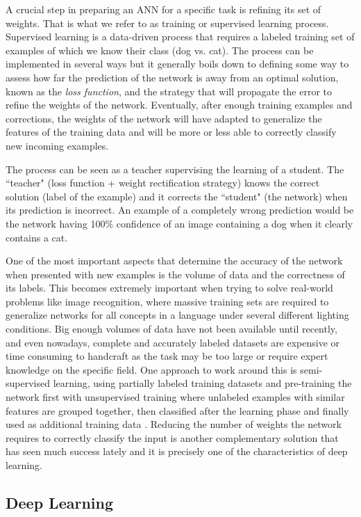 A crucial step in preparing an ANN for a specific task is refining its set of weights.
That is what we refer to as training or supervised learning process.
Supervised learning is a data-driven process that requires a labeled training set of examples of which we know their class (dog vs. cat).
The process can be implemented in several ways but it generally boils down to defining some way to assess how far the prediction of the network is away from an optimal solution, known as the \emph{loss function}, and the strategy that will propagate the error to refine the weights of the network.
Eventually, after enough training examples and corrections, the weights of the network will have adapted to generalize the features of the training data and will be more or less able to correctly classify new incoming examples.

The process can be seen as a teacher supervising the learning of a student.
The ``teacher" (loss function + weight rectification strategy) knows the correct solution (label of the example) and it corrects the ``student" (the network) when its prediction is incorrect.
An example of a completely wrong prediction would be the network having 100\% confidence of an image containing a dog when it clearly contains a cat.

One of the most important aspects that determine the accuracy of the network when presented with new examples is the volume of data and the correctness of its labels.
This becomes extremely important when trying to solve real-world problems like image recognition, where massive training sets are required to generalize networks for all concepts in a language under several different lighting conditions.
Big enough volumes of data have not been available until recently, and even nowadays, complete and accurately labeled datasets are expensive or time consuming to handcraft as the task may be too large or require expert knowledge on the specific field.
One approach to work around this is semi-supervised learning, using partially labeled training datasets and pre-training the network first with unsupervised training where unlabeled examples with similar features are grouped together, then classified after the learning phase and finally used as additional training data \cite{Hinton2006}.
Reducing the number of weights the network requires to correctly classify the input is another complementary solution that has seen much success lately and it is precisely one of the characteristics of deep learning.


\subsection{Deep Learning}
\label{sub:theory:background:deep-learning}

